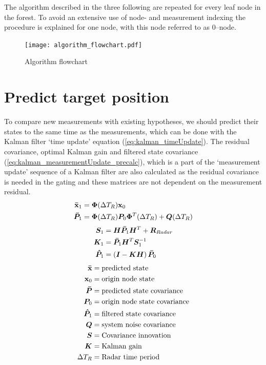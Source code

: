  The algorithm described in the three following are repeated for every leaf node in the forest. To avoid an extensive use of node- and measurement indexing the procedure is explained for one node, with this node referred to as 0--node. 
\begin{figure}
\centering
\texttt{[image: algorithm\_flowchart.pdf]}
\caption{Algorithm flowchart}\label{fig:algorithm_flow}
\end{figure}

\section{Predict target position}
To compare new measurements with existing hypotheses, we should predict their states to the same time as the measurements, which can be done with the Kalman filter `time update' equation (\ref{eq:kalman_timeUpdate}). The residual covariance, optimal Kalman gain and filtered state covariance (\ref{eq:kalman_measurementUpdate_precalc}), which is a part of the `measurement update' sequence of a Kalman filter are also calculated as the residual covariance is needed in the gating and these matrices are not dependent on the measurement residual.
\begin{equation}\label{eq:kalman_timeUpdate}
\begin{split}
\boldsymbol{\mathbf{\bar{x}}}_1 	&= \bm{\Phi}(\Delta T_R) \boldsymbol{\mathbf{x}}_0 \\
\bm{\bar{P}}_1	&= \bm{\Phi}(\Delta T_R) \bm{P}_0  \bm{\Phi}^T(\Delta T_R) + \bm{Q}(\Delta T_R) \\
\end{split}
\end{equation}
\begin{equation}\label{eq:kalman_measurementUpdate_precalc}
\begin{split}
\bm{S}_1		&= \bm{H}\bm{\bar{P}}_1 \bm{H}^T + \bm{R}_{Radar} \\
\bm{K}_1 	&= \bm{\bar{P}}_1 \bm{H}^T \bm{S}_1^{-1} \\
\bm{\hat{P}}_1 &= \left( \bm{I} - \bm{K} \bm{H} \right) \bm{\bar{P}}_0 \\
\end{split}
\end{equation}
\begin{equation*}
\begin{split}
\boldsymbol{\mathbf{\bar{x}}}		&= \text{predicted state} \\
\boldsymbol{\mathbf{x}}_0 		&= \text{origin node state} \\
\bm{\bar{P}} 	&= \text{predicted state covariance} \\
\bm{P}_0 		&= \text{origin node state covariance} \\
\bm{\hat{P}}_1 	&= \text{filtered state covariance} \\
\bm{Q}			&= \text{system noise covariance} \\
\bm{S}			&= \text{Covariance innovation} \\
\bm{K}			&= \text{Kalman gain} \\
\Delta T_R 		&= \text{Radar time period} \\
\end{split}
\end{equation*}

